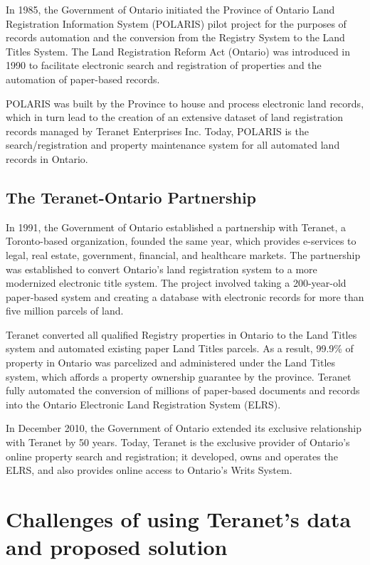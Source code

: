 In 1985, the Government of Ontario initiated the Province of Ontario Land Registration Information System (POLARIS) pilot project for the purposes of records automation and the conversion from the Registry System to the Land Titles System.
The Land Registration Reform Act (Ontario)\cite{TheGovernmentofOntario1990} was introduced in 1990 to facilitate electronic search and registration of properties and the automation of paper-based records.

POLARIS was built by the Province to house and process electronic land records, which in turn lead to the creation of an extensive dataset of land registration records managed by Teranet Enterprises Inc.
Today, POLARIS is the search/registration and property maintenance system for all automated land records in Ontario.

\subsection{The Teranet-Ontario Partnership} \label{subsec:teranet_ontario}

In 1991, the Government of Ontario established a partnership with Teranet\cite{TeranetEnterprisesInc.2019}, a Toronto-based organization, founded the same year, which provides e-services to legal, real estate, government, financial, and healthcare markets.
The partnership was established to convert Ontario's land registration system to a more modernized electronic title system.
The project involved taking a 200-year-old paper-based system and creating a database with electronic records for more than five million parcels of land.

Teranet converted all qualified Registry properties in Ontario to the Land Titles system and automated existing paper Land Titles parcels.
As a result, 99.9\% of property in Ontario was parcelized and administered under the Land Titles system, which affords a property ownership guarantee by the province.
Teranet fully automated the conversion of millions of paper-based documents and records into the Ontario Electronic Land Registration System (ELRS).

In December 2010, the Government of Ontario extended its exclusive relationship with Teranet by 50 years.
Today, Teranet is the exclusive provider of Ontario's online property search and registration;
it developed, owns and operates the ELRS, and also provides online access to Ontario's Writs System.

\section{Challenges of using Teranet's data and proposed solution} \label{sec:challenges}

